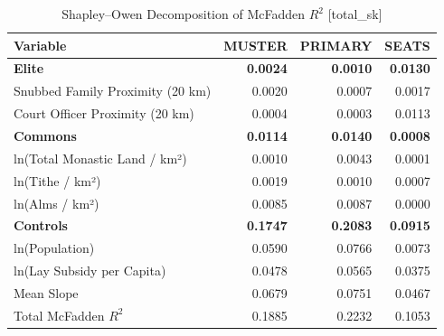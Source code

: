 \begin{table}[H]
\centering
\caption{Shapley--Owen Decomposition of McFadden $R^2$ [total_sk]}
\label{tab:shapley_owen_total_sk}
\begin{tabular}{lrrr}
\hline\hline
Variable & MUSTER & PRIMARY & SEATS \\
\hline
\textbf{Elite} & \textbf{0.0024} & \textbf{0.0010} & \textbf{0.0130} \\
\quad Snubbed Family Proximity (20 km) & 0.0020 & 0.0007 & 0.0017 \\
\quad Court Officer Proximity (20 km) & 0.0004 & 0.0003 & 0.0113 \\
\textbf{Commons} & \textbf{0.0114} & \textbf{0.0140} & \textbf{0.0008} \\
\quad ln(Total Monastic Land / km²) & 0.0010 & 0.0043 & 0.0001 \\
\quad ln(Tithe / km²) & 0.0019 & 0.0010 & 0.0007 \\
\quad ln(Alms / km²) & 0.0085 & 0.0087 & 0.0000 \\
\textbf{Controls} & \textbf{0.1747} & \textbf{0.2083} & \textbf{0.0915} \\
\quad ln(Population) & 0.0590 & 0.0766 & 0.0073 \\
\quad ln(Lay Subsidy per Capita) & 0.0478 & 0.0565 & 0.0375 \\
\quad Mean Slope & 0.0679 & 0.0751 & 0.0467 \\
\hline
Total McFadden $R^2$ & 0.1885 & 0.2232 & 0.1053 \\
\hline\hline
\end{tabular}
\end{table}
